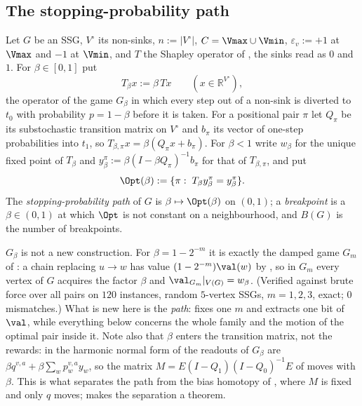 
\subsection{The stopping-probability path}\label{pp:sec}

\begin{definition}\label{pp:def}
Let $G$ be an SSG, $V^{\circ}$ its non-sinks, $n:=|V^{\circ}|$, $C=\Vmax\cup\Vmin$,
$\varepsilon_v:=+1$ at $\Vmax$ and $-1$ at $\Vmin$, and $T$ the Shapley operator
of , the sinks read as $0$ and $1$. For $\beta\in[0,1]$ put
\[
  T_\beta x:=\beta\,Tx\qquad(x\in\mathbb R^{V^{\circ}}),
\]
the operator of the game $G_\beta$ in which every step out of a non-sink is
diverted to $t_0$ with probability $p=1-\beta$ before it is taken. For a
positional pair $\pi$ let $Q_\pi$ be its substochastic transition matrix on
$V^{\circ}$ and $b_\pi$ its vector of one-step probabilities into $t_1$, so
$T_{\beta,\pi}x=\beta(Q_\pi x+b_\pi)$. For $\beta<1$ write $w_\beta$ for the
unique fixed point of $T_\beta$ and
$y^{\pi}_\beta:=\beta(I-\beta Q_\pi)^{-1}b_\pi$ for that of $T_{\beta,\pi}$, and
put
\[
  \Opt(\beta):=\{\pi:\;T_\beta y^{\pi}_\beta=y^{\pi}_\beta\}.
\]
The \emph{stopping-probability path} of $G$ is $\beta\mapsto\Opt(\beta)$ on
$(0,1)$; a \emph{breakpoint} is a $\beta\in(0,1)$ at which $\Opt$ is not
constant on a neighbourhood, and $B(G)$ is the number of breakpoints.
\end{definition}

\begin{remark}\label{pp:damping}
$G_\beta$ is not a new construction. For $\beta=1-2^{-m}$ it is exactly the
damped game $G_m$ of : a chain replacing $u\to w$ has value
$(1-2^{-m})\val(w)$ by , so in $G_m$ every vertex of $G$
acquires the factor $\beta$ and $\val_{G_m}|_{V(G)}=w_\beta$. (Verified against
brute force over all pairs on $120$ instances, random $5$-vertex SSGs,
$m=1,2,3$, exact; $0$ mismatches.) What is new here is the \emph{path}:
 fixes one $m$ and extracts one bit of $\val$,
while everything below concerns the whole family and the motion of the optimal
pair inside it. Note also that $\beta$ enters the transition matrix, not the
rewards: in the harmonic normal form of  the
readouts of $G_\beta$ are $\beta q^{v,a}+\beta\sum_wp^{v,a}_wy_w$, so the matrix
$M=E(I-Q_1)(I-Q_0)^{-1}E$ of  moves with $\beta$. This is what
separates the path from the bias homotopy of , where $M$ is
fixed and only $q$ moves;  makes the separation a theorem.
\end{remark}

